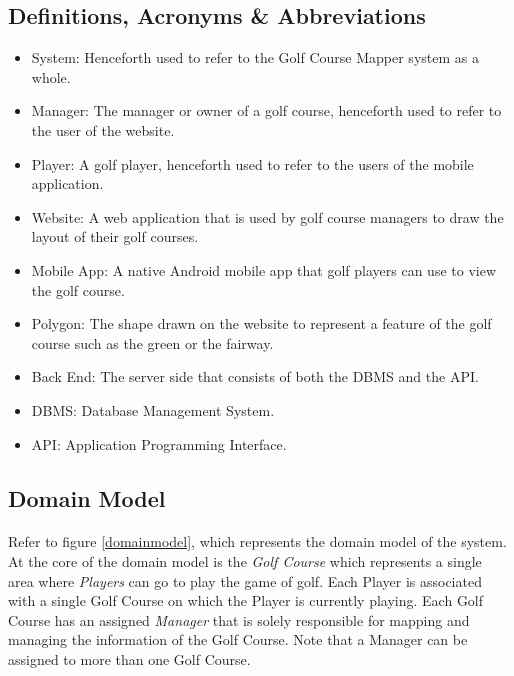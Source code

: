 \documentclass{article}
\begin{document}
    \subsection{Definitions, Acronyms \& Abbreviations}
    \begin{itemize}
        \item
            System: Henceforth used to refer to the Golf Course Mapper system
            as a whole.
        \item
            Manager: The manager or owner of a golf course, henceforth used to
            refer to the user of the website.
        \item
            Player: A golf player, henceforth used to refer to the users of the
            mobile application.
        \item
            Website: A web application that is used by golf course managers
            to draw the layout of their golf courses.
        \item
            Mobile App: A native Android mobile app that golf players can use to
            view the golf course.
        \item
            Polygon: The shape drawn on the website to represent a feature of
            the golf course such as the green or the fairway.
        \item
            Back End: The server side that consists of both the DBMS and the
            API.
        \item
            DBMS: Database Management System.
        \item
            API: Application Programming Interface.
    \end{itemize}

    \subsection{Domain Model}

    \paragraph{}
    Refer to figure \ref{domainmodel}, which represents the domain model of the system. At
    the core of the domain model is the \textit{Golf Course} which represents a
    single area where \textit{Players} can go to play the game of golf. Each
    Player is associated with a single Golf Course on which the Player is
    currently playing. Each Golf Course has an assigned \textit{Manager} that is
    solely responsible for mapping and managing the information of the Golf
    Course. Note that a Manager can be assigned to more than one Golf Course.
\end{document}
